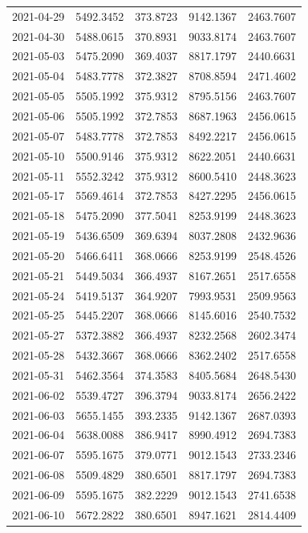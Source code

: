 \begin{footnotesize}
\begin{longtable}{lllll}
2021-04-29 & 5492.3452 & 373.8723 & 9142.1367 & 2463.7607 \\
2021-04-30 & 5488.0615 & 370.8931 & 9033.8174 & 2463.7607 \\
2021-05-03 & 5475.2090 & 369.4037 & 8817.1797 & 2440.6631 \\
2021-05-04 & 5483.7778 & 372.3827 & 8708.8594 & 2471.4602 \\
2021-05-05 & 5505.1992 & 375.9312 & 8795.5156 & 2463.7607 \\
2021-05-06 & 5505.1992 & 372.7853 & 8687.1963 & 2456.0615 \\
2021-05-07 & 5483.7778 & 372.7853 & 8492.2217 & 2456.0615 \\
2021-05-10 & 5500.9146 & 375.9312 & 8622.2051 & 2440.6631 \\
2021-05-11 & 5552.3242 & 375.9312 & 8600.5410 & 2448.3623 \\
2021-05-17 & 5569.4614 & 372.7853 & 8427.2295 & 2456.0615 \\
2021-05-18 & 5475.2090 & 377.5041 & 8253.9199 & 2448.3623 \\
2021-05-19 & 5436.6509 & 369.6394 & 8037.2808 & 2432.9636 \\
2021-05-20 & 5466.6411 & 368.0666 & 8253.9199 & 2548.4526 \\
2021-05-21 & 5449.5034 & 366.4937 & 8167.2651 & 2517.6558 \\
2021-05-24 & 5419.5137 & 364.9207 & 7993.9531 & 2509.9563 \\
2021-05-25 & 5445.2207 & 368.0666 & 8145.6016 & 2540.7532 \\
2021-05-27 & 5372.3882 & 366.4937 & 8232.2568 & 2602.3474 \\
2021-05-28 & 5432.3667 & 368.0666 & 8362.2402 & 2517.6558 \\
2021-05-31 & 5462.3564 & 374.3583 & 8405.5684 & 2648.5430 \\
2021-06-02 & 5539.4727 & 396.3794 & 9033.8174 & 2656.2422 \\
2021-06-03 & 5655.1455 & 393.2335 & 9142.1367 & 2687.0393 \\
2021-06-04 & 5638.0088 & 386.9417 & 8990.4912 & 2694.7383 \\
2021-06-07 & 5595.1675 & 379.0771 & 9012.1543 & 2733.2346 \\
2021-06-08 & 5509.4829 & 380.6501 & 8817.1797 & 2694.7383 \\
2021-06-09 & 5595.1675 & 382.2229 & 9012.1543 & 2741.6538 \\
2021-06-10 & 5672.2822 & 380.6501 & 8947.1621 & 2814.4409 \\

\end{longtable}
\end{footnotesize}

